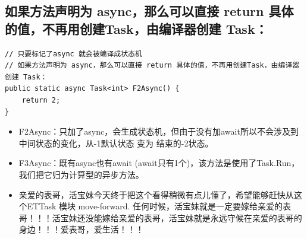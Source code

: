 \documentclass[9pt, b5paper]{article}
\begin{document}
\subsection{如果方法声明为 async，那么可以直接 return 具体的值，不再用创建Task，由编译器创建 Task：}
\label{sec-1-2}
\begin{verbatim}
// 只要标记了async 就会被编译成状态机
// 如果方法声明为 async，那么可以直接 return 具体的值，不再用创建Task，由编译器创建 Task： 
public static async Task<int> F2Async() {
    return 2;
}
\end{verbatim}
\begin{itemize}
\item F2Async：只加了async，会生成状态机，但由于没有加await所以不会涉及到中间状态的变化，从-1默认状态 变为 结束的-2状态。
\end{itemize}
\begin{itemize}
\item F3Async：既有async也有await (await只有1个)，该方法是使用了Task.Run，我们把它归为计算型的异步方法。
\item 亲爱的表哥，活宝妹今天终于把这个看得稍微有点儿懂了，希望能够赶快从这个ETTask 模块 move-forward. 任何时候，活宝妹就是一定要嫁给亲爱的表哥！！！活宝妹还没能嫁给亲爱的表哥，活宝妹就是永远守候在亲爱的表哥的身边！！！爱表哥，爱生活！！！
\end{itemize}
\end{document}
